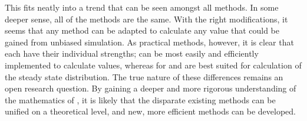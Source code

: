 This fits neatly into a trend that can be seen amongst all  methods. In some deeper sense, all of the  methods are the same\supercite{Tempkin:2016uf,Lie:2017be}. With the right modifications, it seems that any  method can be adapted to calculate any value that could be gained from unbiased simulation. As practical methods, however, it is clear that each have their individual strengths;  can be most easily and efficiently implemented to calculate  values, whereas for  and  are best suited for calculation of the steady state distribution. The true nature of these differences remains an open research question. By gaining a deeper and more rigorous understanding of the mathematics of , it is likely that the disparate existing methods can be unified on a theoretical level, and new, more efficient methods can be developed.


%

